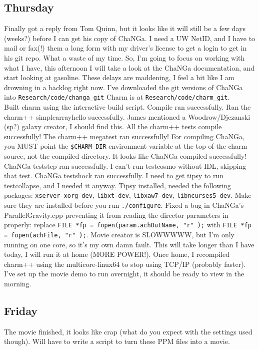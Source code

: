 \documentclass[11pt,letterpaper]{article}
\begin{document}
\subsection*{Thursday}
Finally got a reply from Tom Quinn, but it looks like it will still be a few 
days (weeks?) before I can get his copy of ChaNGa.  I need a UW NetID, and I
have to mail or fax(!) them a long form with my driver's license to get a login
to get in his git repo.  What a waste of my time.  So, I'm going to focus on 
working with what I have, this afternoon I will take a look at the ChaNGa 
documentation, and start looking at gasoline.  These delays are maddening, I
feel a bit like I am drowning in a backlog right now.  I've downloaded the git
versions of ChaNGa into \verb!Research/code/changa_git!  Charm is at 
\verb!Research/code/charm_git!.\\
Built charm using the interactive build script.
Compile ran successfully.  Ran the charm++ simplearrayhello successfully.  James
mentioned a Woodrow/Djezanski (sp?) galaxy creator, I should find this.  All the
charm++ tests compile successfully!  The charm++ megatest ran successfully!  For
compiling ChaNGa, you MUST point the \verb!$CHARM_DIR! environment variable at
the top of the charm source, not the compiled directory.  It looks like ChaNGa
compiled successfully!  ChaNGa teststep ran successfully.  I can't run testcosmo
without IDL, skipping that test.  ChaNGa testshock ran successfully.  I need to 
get tipsy to run testcollapse, and I needed it anyway.  Tipsy installed, needed
the following packages: \verb!xserver-xorg-dev!, \verb!libxt-dev!, 
\verb!libxaw7-dev!, \verb!libncurses5-dev!.  Make sure they are installed before
you run \verb!./configure!.  Fixed a bug in ChaNGa's ParallelGravity.cpp 
preventing it from reading the director parameters in properly: 
replace \verb!FILE *fp = fopen(param.achOutName, "r" );! with 
\verb!FILE *fp = fopen(achFile, "r" );!.  Movie creator is SLOWWWWW, but I'm
only running on one core, so it's my own damn fault.  This will take longer than
I have today, I will run it at home (MORE POWER!).  Once home, I recompiled
charm++ using the multicore-linux64 to stop using TCP/IP (probably faster).  
I've set up the movie demo to run overnight, it should be ready to view in the 
morning.
\subsection*{Friday}
The movie finished, it looks like crap (what do you expect with the settings 
used though).  Will have to write a script to turn these PPM files into a movie.
\end{document}
